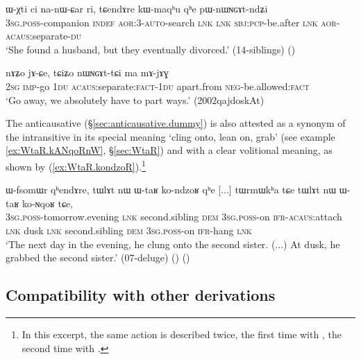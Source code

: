 \begin{exe}
\ex \label{ex:pWnWNGAtndZi}
\gll ɯ-χti ci na-nɯ-ɕar ri, tɕendɤre kɯ-maqʰu qʰe pɯ-nɯɴɢɤt-ndʑi \\
\textsc{3sg}.\textsc{poss}-companion \textsc{indef} \textsc{aor}:3\flobv{}-\textsc{auto}-search \textsc{lnk} \textsc{lnk} \textsc{sbj}:\textsc{pcp}-be.after \textsc{lnk} \textsc{aor}-\textsc{acaus}:separate-\textsc{du} \\
\glt `She found a husband, but they eventually divorced.' (14-siblings) 	()
\end{exe}

\begin{exe}
\ex \label{ex:nWNGAttCi}
\gll nɤʑo jɤ-ɕe, tɕiʑo nɯɴɢɤt-tɕi ma mɤ-jɤɣ \\
\textsc{2sg} \textsc{imp}-go \textsc{1du}  \textsc{acaus}:separate:\textsc{fact}-\textsc{1du} apart.from \textsc{neg}-be.allowed:\textsc{fact} \\
\glt `Go away, we absolutely have to part ways.' (2002qajdoskAt)
\end{exe}

The anticausative  (§\ref{sec:anticausative.dummy}) is also attested as a synonym of the intransitive  in its special meaning `cling onto, lean on, grab' (see example \ref{ex:WtaR.kANqoRnW}, §\ref{sec:WtaR}) and with a clear volitional meaning, as shown by (\ref{ex:WtaR.kondzoR}).\footnote{In this excerpt, the same action is described twice, the first time with , the second time with .}
 
\begin{exe}
\ex \label{ex:WtaR.kondzoR}
\gll  ɯ-fsomɯr qʰendɤre, tɯlɤt nɯ ɯ-taʁ ko-ndzoʁ qʰe [...] tɯrmɯkʰa tɕe tɯlɤt nɯ ɯ-taʁ ko-ɴqoʁ tɕe, \\
\textsc{3sg}.\textsc{poss}-tomorrow.evening \textsc{lnk} second.sibling \textsc{dem} \textsc{3sg}.\textsc{poss}-on \textsc{ifr}-\textsc{acaus}:attach \textsc{lnk} { } dusk \textsc{lnk} second.sibling \textsc{dem} \textsc{3sg}.\textsc{poss}-on \textsc{ifr}-hang \textsc{lnk} \\
\glt `The next day in the evening, he clung onto the second sister. (...) At dusk, he grabbed the second sister.' (07-deluge) () ()
\end{exe}

\subsection{Compatibility with other derivations} \label{sec:anticausative.other.derivations}

